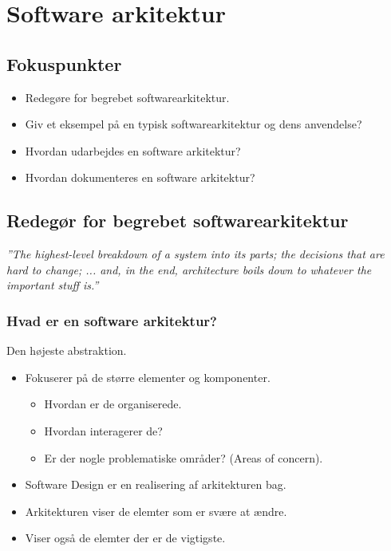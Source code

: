\section{Software arkitektur}

\subsection{Fokuspunkter}

\begin{itemize}
	\item Redegøre for begrebet softwarearkitektur.
	\item Giv et eksempel på en typisk softwarearkitektur og dens anvendelse?
	\item Hvordan udarbejdes en software arkitektur?
	\item Hvordan dokumenteres en software arkitektur?
\end{itemize}

\subsection{Redegør for begrebet softwarearkitektur}
\textit{''The highest-level breakdown of a system into its parts; the decisions that are hard to change; ...  and, in the end, architecture boils down to whatever the important stuff is.''}

\subsubsection{Hvad er en software arkitektur?}
Den højeste abstraktion.

\begin{itemize}
	\item Fokuserer på de større elementer og komponenter.
	\begin{itemize}
		\item Hvordan er de organiserede.
		\item Hvordan interagerer de?
		\item Er der nogle problematiske områder? (Areas of concern).
	\end{itemize}
	\item Software Design er en realisering af arkitekturen bag.
	\item Arkitekturen viser de elemter som er svære at ændre.
	\item Viser også de elemter der er de vigtigste.
\end{itemize}

